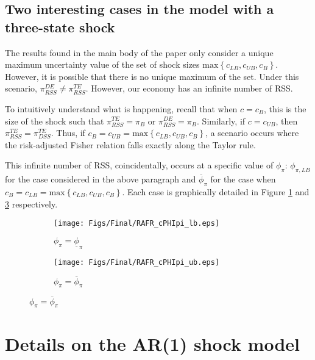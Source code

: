 \documentclass[11pt]{article}
\begin{document}
\begin{singlespace}
		\subsection{Two interesting cases in the model with a three-state shock}
		\label{SS:TwoInterestingCases}
		
		The results found in the main body of the paper only consider a unique maximum uncertainty value of the set of shock sizes $\text{max}\left\{c_{LB}, c_{UB}, c_{B}\right\}$. However, it is possible that there is no unique maximum of the set. Under this scenario, $\pi_{RSS}^{DE} \ne \pi_{RSS}^{TE}$. However, our economy has an infinite number of RSS. 
		
		To intuitively understand what is happening, recall that when $c = c_{B}$, this is the size of the shock such that $\pi_{RSS}^{TE} = \pi_B$ or  $\pi_{RSS}^{DE} = \pi_B$. Similarly, if $c = c_{UB}$, then $\pi_{RSS}^{TE} = \pi_{DSS}^{TE}$. Thus, if $c_{B} = c_{UB} = \text{max}\left\{c_{LB}, c_{UB}, c_{B}\right\}$, a scenario occurs where the risk-adjusted Fisher relation falls exactly along the Taylor rule. 
		
		This infinite number of RSS, coincidentally, occurs at a specific value of $\phi_{\pi}$: $\phi_{\pi, LB}$ for the case considered in the above paragraph and $\overline{\phi}_{\pi}$ for the case when  $c_{B} = c_{LB} = \text{max}\left\{c_{LB}, c_{UB}, c_{B}\right\}$. Each case is graphically detailed in Figure \ref{fig:cPHIpilb} and \ref{fig:cPHIpiub} respectively. 
		
		\begin{figure}[t]
			\caption{Infinity many equilibria}
			\begin{center}
				\begin{subfigure}[b]{0.49\textwidth}
					\centering
					\texttt{[image: Figs/Final/RAFR\_cPHIpi\_lb.eps]}
					\caption{ $\phi_{\pi} = \underline{\phi}_{\pi}$}
					\label{fig:cPHIpilb}
				\end{subfigure}
				\begin{subfigure}[b]{0.49\textwidth}
					\centering
					\texttt{[image: Figs/Final/RAFR\_cPHIpi\_ub.eps]}
					\caption{$\phi_{\pi} = \overline{\phi}_{\pi}$}
					\label{fig:cPHIpiub}
				\end{subfigure}
			\end{center}
		\end{figure}
		
		
		\section{Details on the AR(1) shock model}
		\label{A:SolutionMethod}
		\setcounter{equation}{0}
		

\end{singlespace}
\end{document}
